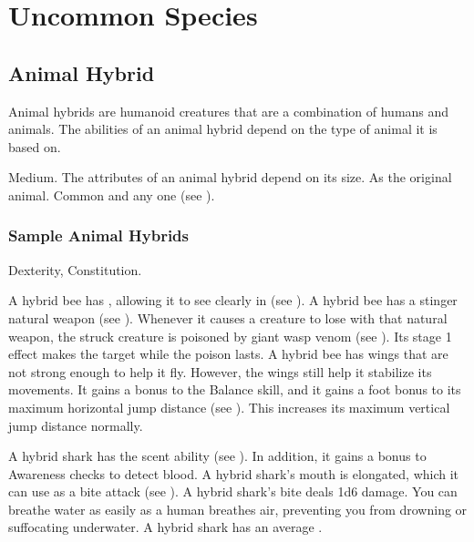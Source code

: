 \chapter{Uncommon Species}\label{Uncommon Species}

\section{Animal Hybrid}
  Animal hybrids are humanoid creatures that are a combination of humans and animals.
  The abilities of an animal hybrid depend on the type of animal it is based on.

   Medium.
   The attributes of an animal hybrid depend on its size.
   As the original animal.
   Common and any one  (see ).

  \subsection{Sample Animal Hybrids}


      Dexterity,  Constitution.
    \begin{itemize}
       A hybrid bee has , allowing it to see clearly in  (see ).
       A hybrid bee has a stinger natural weapon (see ).
        Whenever it causes a creature to lose  with that natural weapon, the struck creature is poisoned by giant wasp venom (see ).
        Its stage 1 effect makes the target \slowed while the poison lasts.
       A hybrid bee has wings that are not strong enough to help it fly.
        However, the wings still help it stabilize its movements.
        It gains a  bonus to the Balance skill, and it gains a  foot bonus to its maximum horizontal jump distance (see ).
        This increases its maximum vertical jump distance normally.
    \end{itemize}


    \begin{itemize}
       A hybrid shark has the scent ability (see ).
        In addition, it gains a  bonus to Awareness checks to detect blood.
       A hybrid shark's mouth is elongated, which it can use as a bite attack (see ).
        A hybrid shark's bite deals 1d6 damage.
       You can breathe water as easily as a human breathes air, preventing you from drowning or suffocating underwater.
       A hybrid shark has an average .
    \end{itemize}

